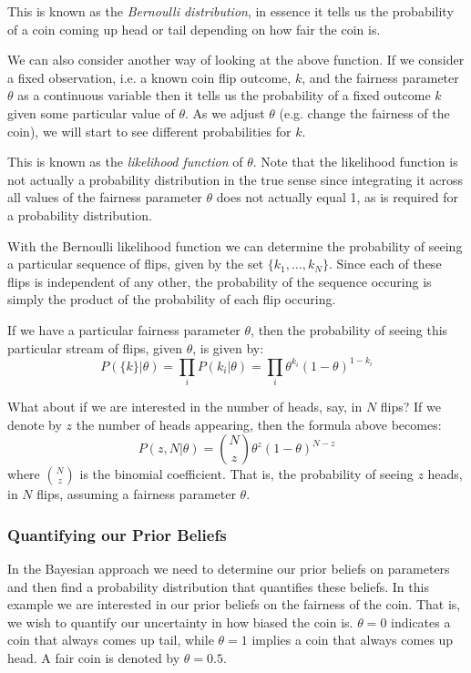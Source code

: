This is known as the \emph{Bernoulli distribution}, in essence it tells us the probability of a coin coming up head or tail depending on how fair the coin is.

We can also consider another way of looking at the above function. If we consider a fixed observation, i.e. a known coin flip outcome, $k$, and the fairness parameter $\theta$ as a continuous variable then it tells us the probability of a fixed outcome $k$ given some particular value of $\theta$. As we adjust $\theta$ (e.g. change the fairness of the coin), we will start to see different probabilities for $k$.

This is known as the \emph{likelihood function} of $\theta$. Note that the likelihood function is not actually a probability distribution in the true sense since integrating it across all values of the fairness parameter $\theta$ does not actually equal 1, as is required for a probability distribution.

With the Bernoulli likelihood function we can determine the probability of seeing a particular sequence of flips, given by the set $\{k_1,\ldots,k_N\}$. Since each of these flips is independent of any other, the probability of the sequence occuring is simply the product of the probability of each flip occuring.

If we have a particular fairness parameter $\theta$, then the probability of seeing this particular stream of flips, given $\theta$, is given by:
\begin{equation}
  P(\{k\}|\theta)=\prod_{i}P(k_i|\theta)=\prod_i \theta^{k_i}(1-\theta)^{1-k_i}
\end{equation}

What about if we are interested in the number of heads, say, in $N$ flips? If we denote by $z$ the number of heads appearing, then the formula above becomes:
\begin{equation}
  P(z,N|\theta) = \binom{N}{z}\theta^z(1-\theta)^{N-z}
\end{equation}
where $\binom{N}{z}$ is the binomial coefficient. That is, the probability of seeing $z$ heads, in $N$ flips, assuming a fairness parameter $\theta$. 

\subsubsection{Quantifying our Prior Beliefs}
In the Bayesian approach we need to determine our prior beliefs on parameters and then find a probability distribution that quantifies these beliefs.
In this example we are interested in our prior beliefs on the fairness of the coin. That is, we wish to quantify our uncertainty in how biased the coin is. $\theta=0$ indicates a coin that always comes up tail, while $\theta=1$ implies a coin that always comes up head. A fair coin is denoted by $\theta=0.5$.


